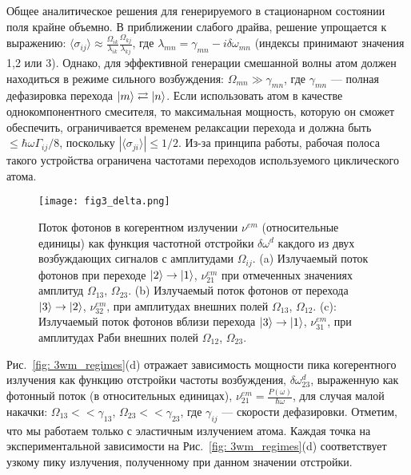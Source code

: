 Общее аналитическое решения для генерируемого в стационарном состоянии поля крайне объемно. В приближении слабого драйва, решение упрощается к выражению: $\langle\sigma_{ij}\rangle\approx\frac{\Omega_{ik}}{\lambda_{ik}}\frac{\Omega_{kj}}{\lambda_{kj}}$, где $\lambda_{mn}=\gamma_{mn}-i\delta\omega_{mn}$ (индексы принимают значения 1,2 или 3). Однако, для эффективной генерации смешанной волны атом должен находиться в режиме сильного возбуждения: $\Omega_{mn}\gg\gamma_{mn}$, где $\gamma_{mn}$ --- полная дефазировка перехода $\ket{m}\rightleftarrows\ket{n}$. Если использовать атом в качестве однокомпонентного смесителя, то максимальная мощность, которую он сможет обеспечить, ограничивается временем релаксации перехода и должна быть $\leq\hbar\omega\Gamma_{ij}/8$, поскольку $|\langle\sigma_{ji}\rangle| \leq 1/2$. Из-за принципа работы, рабочая полоса такого устройства ограничена частотами переходов используемого циклического атома.
\begin{figure}[!htb]
\centering
\texttt{[image: fig3\_delta.png]} 
\caption{Поток фотонов в когерентном излучении  $\nu^{em}$ (относительные единицы) как функция частотной отстройки $\delta\omega^{d}$ какдого из двух возбуждающих сигналов с амплитудами $\Omega_{ij}$. (a) Излучаемый поток фотонов при переходе $\ket{2}\rightarrow \ket{1}$, $\nu^{em}_{21}$ при отмеченных значениях амплитуд $\Omega_{13}$, $\Omega_{23}$. (b) Излучаемый поток фотонов от перехода $\ket{3}\rightarrow \ket{2}$, $\nu^{em}_{32}$, при амплитудах внешних полей $\Omega_{13}$, $\Omega_{12}$. (c): Излучаемый поток фотонов вблизи перехода $\ket{3}\rightarrow \ket{1}$, $\nu^{em}_{31}$, при амплитудах Раби внешних полей $\Omega_{12}$, $\Omega_{23}$.}
\label{fig:exp_em}
\end{figure}

Рис.~\ref{fig: 3wm_regimes}(d) отражает зависимость мощности пика когерентного излучения как функцию отстройки частоты возбуждения, $\delta\omega_{23}^d$, выраженную как фотонный поток (в относительных единицах), 
$\nu^{em}_{21}=\frac{P(\omega)}{\hbar\omega}$, для случая малой накачки: $\Omega_{13}<<\gamma_{13}$, $\Omega_{23}<<\gamma_{23}$, где $\gamma_{ij}$ --- скорости дефазировки. Отметим, что мы работаем только с эластичным излучением атома. Каждая точка на экспериментальной зависимости на Рис.~\ref{fig: 3wm_regimes}(d) соответствует узкому пику излучения, полученному при данном значении отстройки.

